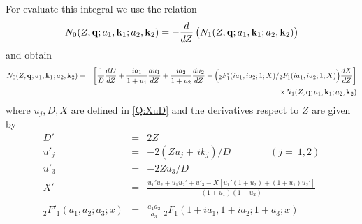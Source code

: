 For evaluate this integral we use the relation
%
\[
N_{0}(Z,\vect{q}; a_{1},\vect{k}_{1}; a_{2},\vect{k}_{2}) = - \frac{d
}{d Z}\left( N_{1}(Z,\vect{q}; a_{1},\vect{k}_{1}; a_{2},\vect{k}_{2})
\vstretch \right)
\]
%
and obtain
%
\begin{eqnarray*}
N_{0}(Z,\mathbf{q}; a_{1},\mathbf{k}_{1}; a_{2},\mathbf{k}_{2}) &=& \left[\frac{1}{D} \frac{d D}{d Z} + \frac{i a_{1}}{1 + u_{1}}
\frac{d u_{1}}{d Z} + \frac{i a_{2}}{1 + u_{2}}\frac{d
u_{2}}{d Z} - \Big({{_{2}F'_{1}}(i a_{1}, i a_{2}; 1;X) }/{{_{2}F_{1}}(i a_{1}, i a_{2}; 1; X)}\Big) \frac{d X}{d Z}
\right]
\\
&&  {\times} N_{1}(Z,\mathbf{q};a_{1},\mathbf{k}_{1}; a_{2},\mathbf{k}_{2})
\end{eqnarray*}
%
where $u_{j},D,X$ are defined in \ref{Q:XuD} and the derivatives
respect to $Z$ are given by
\begin{eqnarray*}
D' &=& 2 Z \nonumber \\
u'_{j}&=& - 2 \left(Z u_{j} + \,i k_{j} \right)/D \qquad \qquad
(j=~1,2)
\nonumber \\
u'_{3} &=& -2 Z u_{3}/D
\nonumber \\
X' &=& \frac{ u_{1}' u_{2} + u_{1} u_{2}' + u'_{3} - X \left[ u_{1}'
(1+u_{2}) + (1+u_{1}) u_{2}' \right]}{(1 + u_{1})(1+u_{2})}
\nonumber \\
\\
{_{2}F'_{1}}(a_{1}, a_{2}; a_{3}; x) &=& \frac{a_{1} a_{2}}{a_{3}} \;
{_{2}F_{1}}(1 + i a_{1}, 1 + i a_{2};1+a_{3};x) \nonumber
\end{eqnarray*}

